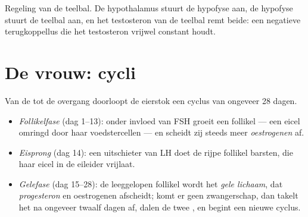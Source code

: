 \begin{omfigure}

{\small Regeling van de teelbal. De hypothalamus stuurt de hypofyse aan,
de hypofyse stuurt de teelbal aan, en het testosteron van de teelbal remt
beide: een negatieve terugkoppellus die het testosteron vrijwel constant
houdt.}
\end{omfigure}

\section{De vrouw: cycli}

\begin{proposition}[De eierstokcyclus]\label{prop:g11:hormones-and-reproduction:ovary}
Van de  tot de overgang doorloopt de eierstok een cyclus van
ongeveer 28 dagen.
\begin{itemize}
  \item \emph{Follikelfase} (dag 1--13): onder invloed van FSH groeit een
        follikel --- een eicel omringd door haar voedstercellen --- en
        scheidt zij steeds meer \emph{oestrogenen} af.
  \item \emph{Eisprong} (dag 14): een uitschieter van LH doet de rijpe
        follikel barsten, die haar eicel in de eileider vrijlaat.
  \item \emph{Gelefase} (dag 15--28): de leeggelopen follikel wordt het
        \emph{gele lichaam}, dat \emph{progesteron} en oestrogenen
        afscheidt; komt er geen zwangerschap, dan takelt het na ongeveer
        twaalf dagen af, dalen de twee , en begint een nieuwe
        cyclus.
\end{itemize}
\end{proposition}
\admitted


